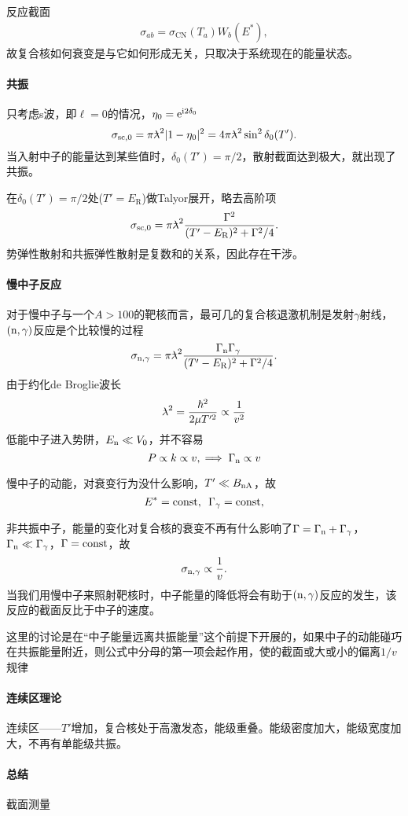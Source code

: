 反应截面
\begin{align}
	\sigma_{ab}=\sigma_{\mathrm{CN}}(T_a)W_b(E^\ast),
\end{align}
故复合核如何衰变是与它如何形成无关，只取决于系统现在的能量状态。
\paragraph{共振}只考虑s波，即$\ell=0$的情况，$\eta_0=\mathop{}\!\mathrm{e}^{\mathrm{i}2\delta_0}$
\[
	\sigma_{\mathrm{sc},0}=\pi\lambdabar^2|1-\eta_0|^2=4\pi\lambdabar^2\sin^2\delta_0(T').
\]
当入射中子的能量达到某些值时，$\delta_0(T')=\pi/2$，散射截面达到极大，就出现了共振。

在$\delta_0(T')=\pi/2$处($T'=E_\mathrm R$)做Talyor展开，略去高阶项
\[
	\sigma_{\mathrm{sc},0}=\pi{^{_-}\!\!\!\!\lambda}^2\frac{\Gamma^2}{(T'-E_\mathrm R)^2+\Gamma^2/4}.
\]
势弹性散射和共振弹性散射是复数和的关系，因此存在干涉。
\paragraph{慢中子反应}对于慢中子与一个$A>100$的靶核而言，最可几的复合核退激机制是发射$\gamma$射线，$(\mathrm n,\gamma)$反应是个比较慢的过程
\[
	\sigma_{\mathrm n,\gamma}=\pi{^{_-}\!\!\!\!\lambda}^2\frac{\Gamma_\mathrm n\Gamma_\gamma}{(T'-E_\mathrm R)^2+\Gamma^2/4}.
\]
由于约化de Broglie波长
\[
	{^{_-}\!\!\!\!\lambda}^2=\frac{\hbar^2}{2\mu T'^2}\propto\frac1{v^2}
\]
低能中子进入势阱，$E_\mathrm n\ll V_0$，并不容易
\[
	P\propto k\propto v,\implies\Gamma_\mathrm n\propto v
\]

慢中子的动能，对衰变行为没什么影响，$T'\ll B_{\mathrm n\mathrm{A}}$，故
\[
	E^\ast=\mathrm{const},\enspace\Gamma_\gamma=\mathrm{const},
\]

非共振中子，能量的变化对复合核的衰变不再有什么影响了$\Gamma=\Gamma_\mathrm n+\Gamma_\gamma$，$\Gamma_\mathrm n\ll\Gamma_\gamma$，$\Gamma=\mathrm{const}$，故
\begin{align}
	\label{slow-neutron}
	\sigma_{\mathrm n,\gamma}\propto\frac1v.
\end{align}
当我们用慢中子来照射靶核时，中子能量的降低将会有助于$(\mathrm n,\gamma)$反应的发生，该反应的截面反比于中子的速度。

这里的讨论是在“中子能量远离共振能量”这个前提下开展的，如果中子的动能碰巧在共振能量附近，则公式中分母的第一项会起作用，使的截面或大或小的偏离$1/v$规律
\paragraph{连续区理论}连续区——$T'$增加，复合核处于高激发态，能级重叠。能级密度加大，能级宽度加大，不再有单能级共振。
\paragraph{总结}截面测量

